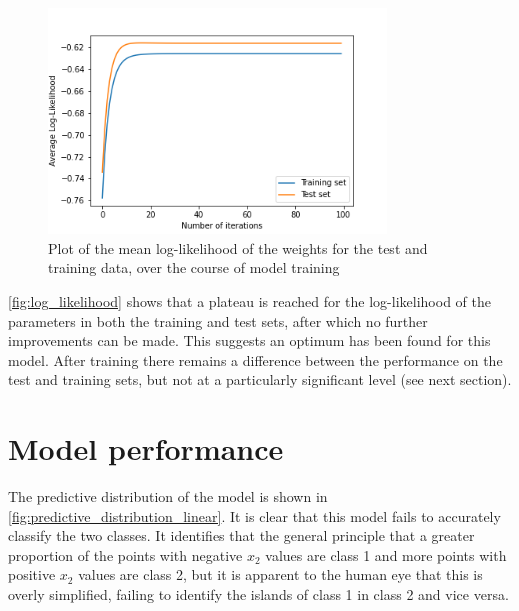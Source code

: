 \documentclass[a4paper]{article}
\begin{document}
    \begin{figure}[h]
        \label{fig:log_likelihood}
        \centering
        \includegraphics[width=0.8\textwidth]{plots/log_likelihood.png}
        \caption{Plot of the mean log-likelihood of the weights for the test and training data, over the
        course of model training}
    \end{figure}

    \autoref{fig:log_likelihood} shows that a plateau is reached for the log-likelihood of the parameters in both the
    training and test sets, after which no further improvements can be made. This suggests an optimum has been found for
    this model. After training there remains a difference between the performance on the test and
    training sets, but not at a particularly significant level (see next section).

    \section{Model performance}
    The predictive distribution of the model is shown in \autoref{fig:predictive_distribution_linear}. It is clear that
    this model fails to accurately classify the two classes. It identifies that the general principle that a greater
    proportion of the points with negative $x_2$ values are class 1 and more points with positive $x_2$ values are class
    2, but it is apparent to the human eye that this is overly simplified, failing to identify the islands of class 1 in
    class 2 and vice versa.
\end{document}
